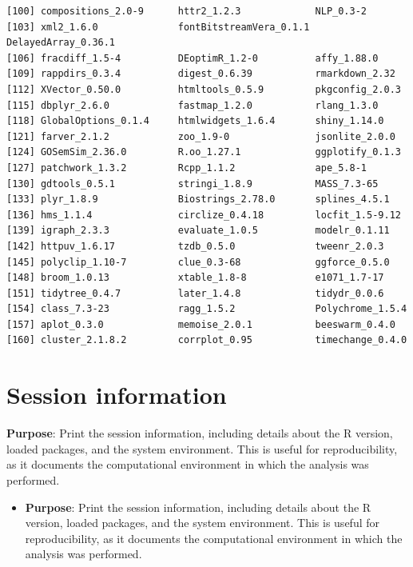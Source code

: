 \documentclass[
  11pt,
]{article}
\providecommand{\tightlist}{%
  \setlength{\itemsep}{0pt}\setlength{\parskip}{0pt}}\usepackage{longtable,booktabs,array}
\begin{document}
\begin{verbatim}
[100] compositions_2.0-9      httr2_1.2.3             NLP_0.3-2              
[103] xml2_1.6.0              fontBitstreamVera_0.1.1 DelayedArray_0.36.1    
[106] fracdiff_1.5-4          DEoptimR_1.2-0          affy_1.88.0            
[109] rappdirs_0.3.4          digest_0.6.39           rmarkdown_2.32         
[112] XVector_0.50.0          htmltools_0.5.9         pkgconfig_2.0.3        
[115] dbplyr_2.6.0            fastmap_1.2.0           rlang_1.3.0            
[118] GlobalOptions_0.1.4     htmlwidgets_1.6.4       shiny_1.14.0           
[121] farver_2.1.2            zoo_1.9-0               jsonlite_2.0.0         
[124] GOSemSim_2.36.0         R.oo_1.27.1             ggplotify_0.1.3        
[127] patchwork_1.3.2         Rcpp_1.1.2              ape_5.8-1              
[130] gdtools_0.5.1           stringi_1.8.9           MASS_7.3-65            
[133] plyr_1.8.9              Biostrings_2.78.0       splines_4.5.1          
[136] hms_1.1.4               circlize_0.4.18         locfit_1.5-9.12        
[139] igraph_2.3.3            evaluate_1.0.5          modelr_0.1.11          
[142] httpuv_1.6.17           tzdb_0.5.0              tweenr_2.0.3           
[145] polyclip_1.10-7         clue_0.3-68             ggforce_0.5.0          
[148] broom_1.0.13            xtable_1.8-8            e1071_1.7-17           
[151] tidytree_0.4.7          later_1.4.8             tidydr_0.0.6           
[154] class_7.3-23            ragg_1.5.2              Polychrome_1.5.4       
[157] aplot_0.3.0             memoise_2.0.1           beeswarm_0.4.0         
[160] cluster_2.1.8.2         corrplot_0.95           timechange_0.4.0       
\end{verbatim}

\section{Session information}\label{session-information-3}

\textbf{Purpose}: Print the session information, including details about
the R version, loaded packages, and the system environment. This is
useful for reproducibility, as it documents the computational
environment in which the analysis was performed.

\begin{itemize}
\tightlist
\item
  \textbf{Purpose}: Print the session information, including details
  about the R version, loaded packages, and the system environment. This
  is useful for reproducibility, as it documents the computational
  environment in which the analysis was performed.
\end{itemize}
\end{document}
